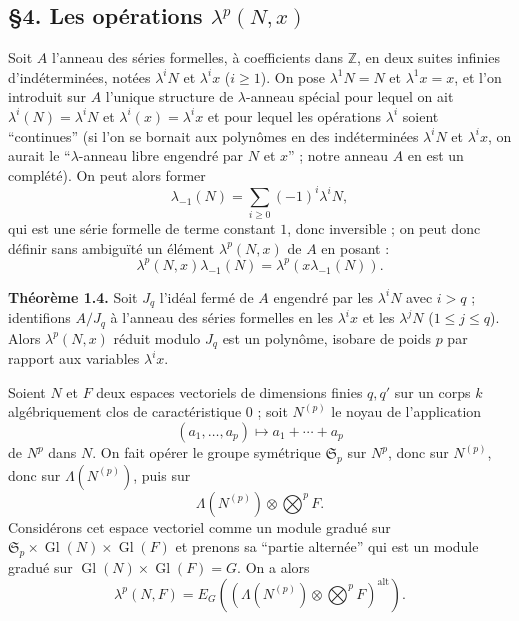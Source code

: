 \documentclass[11pt]{article}
\providecommand{\Z}{\mathbb Z}
\providecommand{\Gl}{\operatorname{Gl}}
\begin{document}
\subsection*{\S 4. Les opérations $\lambda^p(N,x)$}

Soit $A$ l'anneau des séries formelles, à coefficients dans $\Z$, en deux suites infinies d'indéterminées, notées $\lambda^iN$ et $\lambda^i x$ ($i\geq1$). On pose $\lambda^1N=N$ et $\lambda^1x=x$, et l'on introduit sur $A$ l'unique structure de $\lambda$-anneau spécial pour lequel on ait $\lambda^i(N)=\lambda^iN$ et $\lambda^i(x)=\lambda^ix$ et pour lequel les opérations $\lambda^i$ soient ``continues'' (si l'on se bornait aux polynômes en des indéterminées $\lambda^iN$ et $\lambda^ix$, on aurait le ``$\lambda$-anneau libre engendré par $N$ et $x$'' ; notre anneau $A$ en est un complété). On peut alors former
\begin{equation}\tag{1.31}
\lambda_{-1}(N)=\sum_{i\geq0}(-1)^i\lambda^iN,
\end{equation}
qui est une série formelle de terme constant $1$, donc inversible ; on peut donc définir sans ambiguïté un élément $\lambda^p(N,x)$ de $A$ en posant :
\begin{equation}\tag{1.32}
\lambda^p(N,x)\lambda_{-1}(N)=\lambda^p(x\lambda_{-1}(N)).
\end{equation}

\textbf{Théorème 1.4.} Soit $J_q$ l'idéal fermé de $A$ engendré par les $\lambda^iN$ avec $i>q$ ; identifions $A/J_q$ à l'anneau des séries formelles en les $\lambda^i x$ et les $\lambda^jN$ ($1\leq j\leq q$). Alors $\lambda^p(N,x)$ réduit modulo $J_q$ est un polynôme, isobare de poids $p$ par rapport aux variables $\lambda^i x$.

Soient $N$ et $F$ deux espaces vectoriels de dimensions finies $q,q'$ sur un corps $k$ algébriquement clos de caractéristique $0$ ; soit $N^{(p)}$ le noyau de l'application
\[
(a_1,\ldots,a_p)\longmapsto a_1+\cdots+a_p
\]
de $N^p$ dans $N$. On fait opérer le groupe symétrique $\mathfrak S_p$ sur $N^p$, donc sur $N^{(p)}$, donc sur $\Lambda(N^{(p)})$, puis sur
\[
\Lambda(N^{(p)})\otimes\bigotimes^p F.
\]
Considérons cet espace vectoriel comme un module gradué sur $\mathfrak S_p\times\Gl(N)\times\Gl(F)$ et prenons sa ``partie alternée'' qui est un module gradué sur $\Gl(N)\times\Gl(F)=G$. On a alors
\begin{equation}\tag{1.33}
\lambda^p(N,F)=E_G\left(\left(\Lambda(N^{(p)})\otimes\bigotimes^p F\right)^{\mathrm{alt}}\right).
\end{equation}
\end{document}

